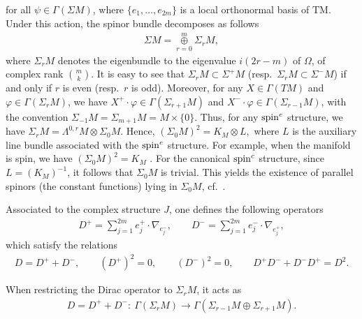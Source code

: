 \documentclass[10pt,a4paper]{amsart}
\numberwithin{equation}{section}
\theoremstyle{definition}
\begin{document}
for all $\psi\in\Gamma(\Sigma M)$, where $\{e_1, \dots, e_{2m}\}$ is a local orthonormal basis of $\mathrm{TM}$. Under this action, the spinor bundle decomposes as follows
\begin{gather}\label{decomp}
\Sigma M =\overset{m}{\underset{r=0}{\oplus}} \Sigma_r M,
\end{gather}
where $\Sigma_r M$ denotes the eigenbundle to the eigenvalue $i(2r-m)$ of $\Omega$, of complex rank $\binom{m}{k}$.
It is easy to see that $\Sigma_r M \subset \Sigma^+ M$ (resp.\ $\Sigma_r M \subset \Sigma^-M$) if and only if $r$ is even (resp.~$r$ is odd).
Moreover, for any $X \in \Gamma(TM)$ and $\varphi \in \Gamma(\Sigma_r M)$, we have $X^+ \cdot\varphi \in \Gamma(\Sigma_{r+1}M)$
and $X^-\cdot \varphi \in \Gamma(\Sigma_{r-1} M)$, with the convention $\Sigma_{-1}M=\Sigma_{m+1}M=M\times\{0\}$.
Thus, for any ${\mathop{\rm spin}^c}$ structure, we have
$\Sigma_r M = \Lambda^{0, r} M\otimes \Sigma_0 M$.
Hence, $(\Sigma_0M)^2 = K_M \otimes L,$ where $L$ is the auxiliary line bundle associated with the ${\mathop{\rm spin}^c}$ structure. For example, when the manifold is spin, we have $(\Sigma_0M)^2 = K_M$ \cite{hit, kirch86}.  For the canonical ${\mathop{\rm spin}^c}$ structure, since $L = (K_M)^{-1}$, it follows that $\Sigma_0 M$ is trivial. This yields the existence of parallel spinors (the constant functions) lying in $\Sigma_0M$, cf.~\cite{Moro1}.

Associated to the complex structure $J$, one def\/ines the following operators
\begin{gather*}%
D^+ =\sum_{j=1}^{2m}e_j^+\cdot \nabla_{e_j^-},\qquad D^- =\sum_{j=1}^{2m}e_j^-\cdot \nabla_{e_j^+},
\end{gather*}
which satisfy the relations
\begin{gather*} %
D=D^+ +D^-, \qquad (D^+)^2=0, \qquad (D^-)^2=0, \qquad D^+D^- + D^-D^+ =D^2.
\end{gather*}

When restricting the Dirac operator to $\Sigma_{r}M$, it acts as
\begin{gather*}
D=D^+ +D^-\colon \ \Gamma(\Sigma_{r}M) \to \Gamma(\Sigma_{r-1}M\oplus\Sigma_{r+1}M).
\end{gather*}
\end{document}
